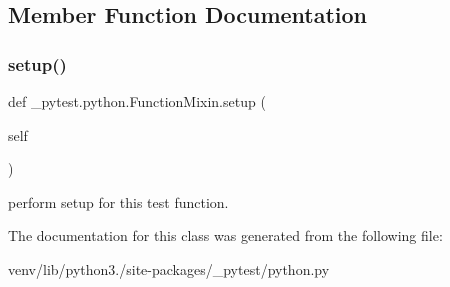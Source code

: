 \subsection{Member Function Documentation}
\mbox{\label{class__pytest_1_1python_1_1_function_mixin_ae6c067be4ffb2695a34c661d2d6a4396}} 
\subsubsection{\texorpdfstring{setup()}{setup()}}
{\footnotesize\ttfamily def \+\_\+pytest.\+python.\+Function\+Mixin.\+setup (\begin{DoxyParamCaption}\item[{}]{self }\end{DoxyParamCaption})}

\begin{DoxyVerb}perform setup for this test function. \end{DoxyVerb}
 

The documentation for this class was generated from the following file\+:\begin{DoxyCompactItemize}
\item 
venv/lib/python3./site-\/packages/\+\_\+pytest/python.\+py\end{DoxyCompactItemize}
